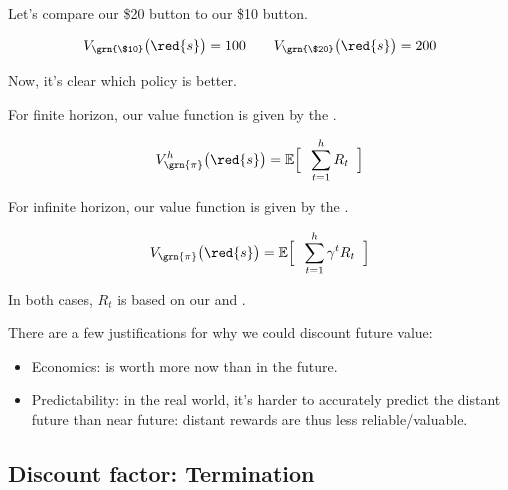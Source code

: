         Let's compare our \$20 button to our \$10 button. 

        \begin{equation}
            V_{\grn{\$10}}\big(\red{s} \big) = 100 \qquad 
            V_{\grn{\$20}}\big(\red{s} \big) = 200
        \end{equation}

        Now, it's clear which policy is better.\\

        \begin{definition}
            For finite horizon, our value function is given by the .

            \begin{equation*}
                V_{\grn{\pi}}^{h}\big(\red{s} \big)
                =
                \mathbb{E} \Big[\;\;
                    \sum_{t=1}^h R_t
                \;\;\Big]
            \end{equation*}

            For infinite horizon, our value function is given by the .

            \begin{equation*}
                V_{\grn{\pi}}\big(\red{s} \big)
                =
                \mathbb{E} \Big[\;\;
                    \sum_{t=1}^h \gamma^t R_t
                \;\;\Big]
            \end{equation*}

            \subsecdiv

            In both cases, $R_t$ is based on our  and . 
        \end{definition}


        There are a few justifications for why we could discount future value:

        \begin{itemize}
            \item Economics:  is worth more now than in the future.
            \item Predictability: in the real world, it's harder to accurately predict the distant future than near future: distant rewards are thus less reliable/valuable.
        \end{itemize}

    \subsection{Discount factor: Termination}

